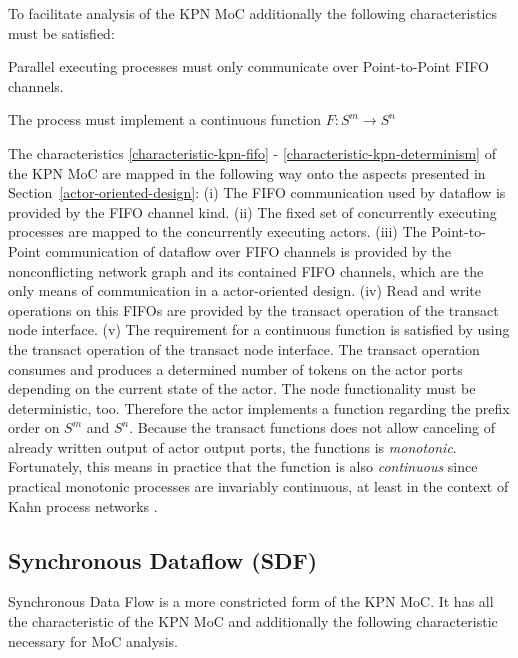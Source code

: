 To facilitate analysis of the KPN MoC additionally the following
characteristics must be satisfied:
\begin{characteristic}\label{characteristic-kpn-communication}
  Parallel executing processes must only communicate over Point-to-Point FIFO channels.
\end{characteristic}

\begin{characteristic}\label{characteristic-kpn-determinism}
  The process must implement a continuous function $F: S^m \to S^n$
\end{characteristic}

The characteristics \ref{characteristic-kpn-fifo} -
\ref{characteristic-kpn-determinism} of the KPN MoC are mapped in the following way
onto the aspects presented in Section~\ref{actor-oriented-design}:
(i) The FIFO communication
used by dataflow is provided by the FIFO channel kind.
(ii) The fixed set of concurrently executing processes
are mapped to the concurrently executing actors.
(iii) The Point-to-Point communication of dataflow over FIFO channels
is provided by the nonconflicting network graph
and its contained FIFO channels, which are the only means of communication in a
actor-oriented design.
(iv) Read and write operations on this FIFOs are provided by
the transact operation of the transact node interface.
(v) The requirement for a continuous function is satisfied by using the
transact operation of the transact node interface.
The transact operation consumes and produces
a determined number of tokens on the actor ports
depending on the current state of the actor.
The node functionality must be deterministic, too.
Therefore the actor implements a function regarding the
prefix order on $S^m$ and $S^n$. Because the
transact functions does not allow canceling of already
written output of actor output ports, the functions is
\emph{monotonic}. Fortunately, this means in practice
that the function is also \emph{continuous} since practical monotonic
processes are invariably continuous, at least in the context
of Kahn process networks \cite{LeeDenotialDF:1997}.

\subsection{Synchronous Dataflow (SDF)}
Synchronous Data Flow \cite{Lee87b:1987} is a more constricted form of the
KPN MoC. It has all the characteristic of the KPN MoC and additionally the
following characteristic necessary for MoC analysis.


